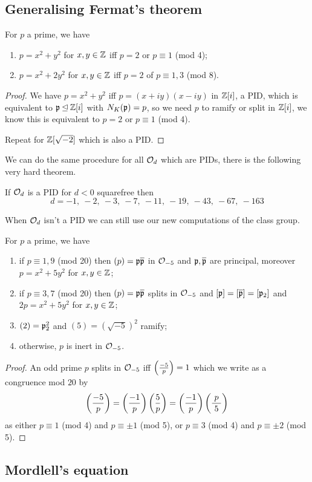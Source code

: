 \documentclass{article}
\begin{document}
\subsection{Generalising Fermat's theorem}

\begin{theorem}[Fermat]
    For $p$ a prime, we have \begin{enumerate}
        \item $p=x^2+y^2$ for $x,y\in \mathbb{Z}$ iff $p = 2$ or $p\equiv 1$ (mod 4);
        \item $p=x^2+2y^2$ for $x,y\in \mathbb{Z}$ iff $p=2$ of $p\equiv 1,3$ (mod 8).
    \end{enumerate}\begin{proof}
        We have $p=x^2+y^2$ iff $p=(x+iy)(x-iy)$ in $\mathbb{Z}[i]$, a PID, which is equivalent to $\mathfrak{p}\unlhd \mathbb{Z}[i]$ with $N_K(\mathfrak{p})=p$, so we need $p$ to ramify or split in $\mathbb{Z}[i]$, we know this is equivalent to $p=2$ or $p\equiv 1$ (mod 4).

        Repeat for $\mathbb{Z}[\sqrt{-2}]$ which is also a PID.
    \end{proof}
\end{theorem}

We can do the same procedure for all $\mathcal{O}_d$ which are PIDs, there is the following very hard theorem.

\begin{theorem}
    If $\mathcal{O}_d$ is a PID for $d<0$ squarefree then \[
    d = -1,\ -2,\ -3,\ -7,\ -11,\ -19,\ -43,\ -67,\ -163
    \]
\end{theorem}

When $\mathcal{O}_d$ isn't a PID we can still use our new computations of the class group.

\begin{theorem}
    For $p$ a prime, we have \begin{enumerate}
        \item if $p\equiv 1,9$ (mod 20) then $(p)=\mathfrak{p}\overline{\mathfrak{p}}$ in $\mathcal{O}_{-5}$ and $\mathfrak{p},\overline{\mathfrak{p}}$ are principal, moreover $p=x^2+5y^2$ for $x,y\in \mathbb{Z}$;
        \item if $p\equiv 3,7$ (mod 20) then $(p)=\mathfrak{p}\overline{\mathfrak{p}}$ splits in $\mathcal{O}_{-5}$ and $[\mathfrak{p}]=[\overline{\mathfrak{p}}]=[\mathfrak{p}_2]$ and $2p=x^2+5y^2$ for $x,y\in \mathbb{Z}$;
        \item $(2) = \mathfrak{p}_2^2$ and $(5)=(\sqrt{-5})^2$ ramify;
        \item otherwise, $p$ is inert in $\mathcal{O}_{-5}$.
    \end{enumerate}\begin{proof}
        An odd prime $p$ splits in $\mathcal{O}_{-5}$ iff $\left( \frac{-5}{p} \right)=1$ which we write as a congruence mod $20$ by \[
        \left( \frac{-5}{p} \right) = \left( \frac{-1}{p} \right)\left( \frac{5}{p} \right) = \left( \frac{-1}{p} \right)\left( \frac{\phantom{|}p\phantom{|}}{5} \right)
        \] as either $p \equiv 1$ (mod 4) and $p \equiv \pm 1$ (mod 5), or $p\equiv 3$ (mod 4) and $p\equiv \pm 2$ (mod 5).
    \end{proof}
\end{theorem}

\subsection{Mordlell's equation}
\end{document}
